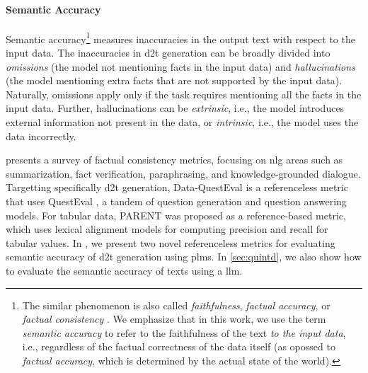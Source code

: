 {\paragraph{Semantic Accuracy} Semantic accuracy\footnote{The similar phenomenon is also called \emph{faithfulness}, \emph{factual accuracy}, or \emph{factual consistency} \cite{celikyilmazEvaluationTextGeneration2021}. We emphasize that in this work, we use the term \emph{semantic accuracy} to refer to the faithfulness of the text \emph{to the input data}, i.e., regardless of the factual correctness of the data itself (as opossed to \emph{factual accuracy}, which is determined by the actual state of the world).} measures inaccuracies in the output text with respect to the input data. The inaccuracies in \ac{d2t} generation can be broadly divided into \emph{omissions} (the model not mentioning facts in the input data) and \emph{hallucinations} (the model mentioning extra facts that are not supported by the input data). Naturally, omissions apply only if the task requires mentioning all the facts in the input data. Further, hallucinations can be \emph{extrinsic}, i.e., the model introduces external information not present in the data, or \emph{intrinsic}, i.e., the model uses the data incorrectly. \cite{maynezFaithfulnessFactualityAbstractive2020}


\citet{honovich2022true} presents a survey of factual consistency metrics, focusing on \ac{nlg} areas such as summarization, fact verification, paraphrasing, and knowledge-grounded dialogue. Targetting specifically \ac{d2t} generation, Data-QuestEval \cite{rebuffel2021data} is a referenceless metric that uses QuestEval \cite{scialomQuestEvalSummarizationAsks2021}, a tandem of question generation and question answering models. For tabular data, PARENT \cite{dhingraHandlingDivergentReference2019} was proposed as a reference-based metric, which uses lexical alignment models for computing precision and recall for tabular values. In , we present two novel referenceless metrics for evaluating semantic accuracy of \ac{d2t} generation using \acp{plm}. In \autoref{sec:quintd}, we also show how to evaluate the semantic accuracy of texts using a \ac{llm}.

}

